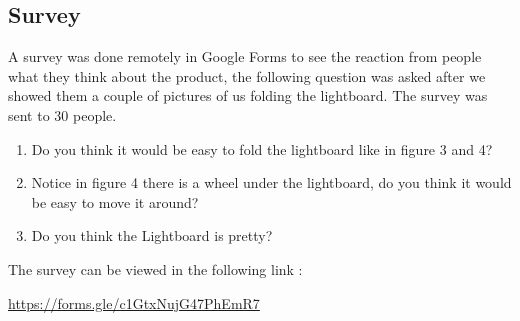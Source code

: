 \documentclass[a4paper]{jpconf}
\begin{document}
\subsection{Survey}
A survey was done remotely in Google Forms to see the reaction from people what they think about the product, the following question was asked after we showed them a couple of pictures of us folding the lightboard. The survey was sent to 30 people.
\begin{enumerate}
	\item Do you think it would be easy to fold the lightboard like in figure 3 and 4?
	\item Notice in figure 4 there is a wheel under the lightboard, do you think it would be easy to move it around?
	\item Do you think the Lightboard is pretty?
\end{enumerate}
The survey can be viewed in the following link :

\url{https://forms.gle/c1GtxNujG47PhEmR7}

\end{document}
